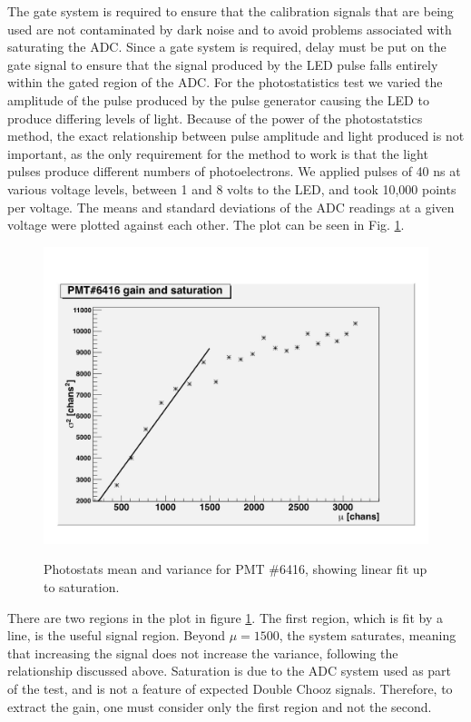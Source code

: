 The gate system is required to ensure that the calibration signals that are being used are not contaminated by dark noise and to avoid problems associated with saturating the ADC. Since a gate system is required, delay must be put on the gate signal to ensure that the signal produced by the LED pulse falls entirely within the gated region of the ADC. For the photostatistics test we varied the amplitude of the pulse produced by the pulse generator causing the LED to produce differing levels of light. Because of the power of the photostatstics method, the exact relationship between pulse amplitude and light produced is not important, as the only requirement for the method to work is that the light pulses produce different numbers of photoelectrons. We applied pulses of 40 ns at various voltage levels, between 1 and 8 volts to the LED, and took 10,000 points per voltage. The means and standard deviations of the ADC readings at a given voltage were plotted against each other. The plot can be seen in Fig. \ref{Photostats 6416}.

\begin{figure}
\caption{Photostats mean and variance for PMT \#6416, showing linear fit up to saturation.}
\includegraphics[width=\textwidth]{DC_Results/Photostats_Gain_6416.jpg}
\label{Photostats 6416}
\end{figure}

There are two regions in the plot in figure \ref{Photostats 6416}. The first region, which is fit by a line, is the useful signal region. Beyond $\mu = 1500$, the system saturates, meaning that increasing the signal does not increase the variance, following the relationship discussed above. Saturation is due to the ADC system used as part of the test, and is not a feature of expected Double Chooz signals.  Therefore, to extract the gain, one must consider only the first region and not the second. 

